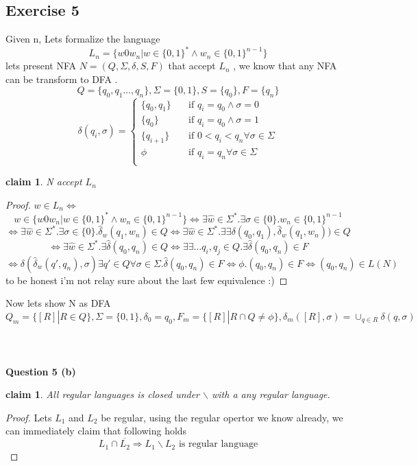 \documentclass[12pt]{article}
\newtheorem{claim}[theorem]{claim}
\begin{document}
\subsection{Exercise 5}
Given n, Lets formalize the language \[L_n=\lbrace w0w_n | w \in \lbrace 0,1\rbrace^* \wedge   w_n \in \lbrace 0,1\rbrace^{n-1}
\rbrace
\]
lets present NFA $N=(Q,\Sigma,\delta,S,F)$ that accept $L_n$ , we know that any NFA can be transform to DFA .\\
\[ Q=\lbrace q_0,q_1\dots ,q_{n} \rbrace 
,\Sigma =\lbrace 0,1\rbrace
,S =\lbrace q_0\rbrace 
,F =\lbrace q_{n}\rbrace \]
\[   
\delta(q_i,\sigma) = 
     \begin{cases} 
      \lbrace q_0,q_1   \rbrace  &\quad\text{if } q_i=q_0 \wedge \sigma=0 \\
       \lbrace q_0   \rbrace  &\quad\text{if     } q_i=q_0 \wedge \sigma=1 \\
        \lbrace q_{i+1}   \rbrace  &\quad \text{if } 0<q_{i}<q_n \forall \sigma \in \Sigma \\
          \phi  &\quad\text{if } q_i=q_n  \forall \sigma \in \Sigma \\ 
     \end{cases}     
\]
\begin{claim}
N accept $L_n$
\end{claim}
\begin{proof}
$w \in L_n \Leftrightarrow$ 
\[ w \in \lbrace w0w_n | w \in \lbrace 0,1\rbrace^* \wedge   w_n \in \lbrace 0,1\rbrace^{n-1}\rbrace
\Leftrightarrow
\exists \hat{w} \in \Sigma^*.\exists \sigma \in \lbrace 0\rbrace
.w_n \in \lbrace 0,1\rbrace^{n-1}
\]
\[
\Leftrightarrow
\exists \hat{w} \in \Sigma^*.\exists \sigma \in \lbrace 0\rbrace
.\hat{\delta}_w(q_1,w_{n})\in Q
\Leftrightarrow
\exists  \hat{w} \in \Sigma^*.\exists \exists \delta(q_0,q_1) ,\hat{\delta}_w(q_1,w_{n}))\in Q
\]
\[
\Leftrightarrow
\exists  \hat{w} \in \Sigma^*.\exists  \hat{\delta}(q_0,q_n)\in Q
\Leftrightarrow
\exists \exists \dots q_i,q_j\in Q.\exists  \hat{\delta}(q_0,q_n)\in F
\]
\[
 \Leftrightarrow \delta(\hat{\delta}_w(q',q_n),\sigma)\exists q' \in Q
 \forall \sigma \in \Sigma .\hat{\delta}(q_0,q_n)\in F \Leftrightarrow
 \phi.(q_0,q_n)\in F
 \Leftrightarrow
 (q_0,q_n)\in L(N)
\]
to be honest i'm not relay sure about the last few equivalence :)
\end{proof}
Now lets show N as DFA 
\[ Q_m=\lbrace [R]|R \in Q \rbrace 
,\Sigma =\lbrace 0,1\rbrace
,\delta_0 = q_0
,F_m =\lbrace [R]|R \cap Q \neq \phi \rbrace,\delta_m([R],\sigma) =\cup_{q \in R} \delta(q,\sigma )
 \]
 \\\\
\\\textbf{Question 5 (b)}
\begin{claim}
All regular languages is closed under $\backslash$ with a
any regular language.
\end{claim}
\begin{proof}
Lets $L_1$ and $L_2$ be regular, using the regular opertor  we know already, we can immediately claim that following holds 
\[ L_1 \cap \overline{L_2} \Rightarrow L_1\backslash L_2 \text{ is regular language} 
\]
\end{proof}
\end{document}
